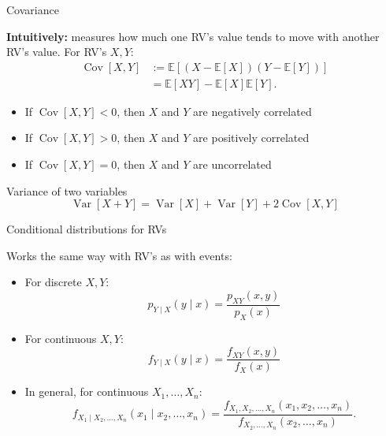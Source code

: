 \documentclass[aspectratio=169,12pt]{beamer}
\DeclareMathOperator{\Var}{Var}
\DeclareMathOperator{\Cov}{Cov}
\begin{document}
\begin{frame}[t]{Covariance}
  \vspace{0.14cm}
  {\small
  \textbf{Intuitively:} measures how much one RV's value tends to move with
  another RV's value. For RV's $X,Y$:
  \[
  \begin{aligned}
    \Cov[X,Y]&:=\mathbb{E}[(X-\mathbb{E}[X])(Y-\mathbb{E}[Y])]\\
             &=\mathbb{E}[XY]-\mathbb{E}[X]\mathbb{E}[Y].
  \end{aligned}
  \]
  \begin{itemize}
    \setlength{\itemsep}{0.10cm}
    \item If $\Cov[X,Y]<0$, then $X$ and $Y$ are negatively correlated
    \item If $\Cov[X,Y]>0$, then $X$ and $Y$ are positively correlated
    \item If $\Cov[X,Y]=0$, then $X$ and $Y$ are uncorrelated
  \end{itemize}
  }
\end{frame}

\begin{frame}[t]{Variance of two variables}
  \vspace{1.55cm}
  {\fontsize{21}{26}\selectfont
  \[
    \Var[X+Y]=\Var[X]+\Var[Y]+2\Cov[X,Y]
  \]
  }
\end{frame}

\begin{frame}[t]{Conditional distributions for RVs}
  \vspace{-0.10cm}
  {
  Works the same way with RV's as with events:
  \begin{itemize}
    \setlength{\itemsep}{0.15cm}
    \item For discrete $X,Y$:
      \[
        p_{Y\mid X}(y\mid x)=\frac{p_{XY}(x,y)}{p_X(x)}
      \]
    \item For continuous $X,Y$:
      \[
        f_{Y\mid X}(y\mid x)=\frac{f_{XY}(x,y)}{f_X(x)}
      \]
    \item In general, for continuous $X_1,\ldots,X_n$:
      \[
        f_{X_1\mid X_2,\ldots,X_n}(x_1\mid x_2,\ldots,x_n)
        =\frac{f_{X_1,X_2,\ldots,X_n}(x_1,x_2,\ldots,x_n)}
        {f_{X_2,\ldots,X_n}(x_2,\ldots,x_n)}.
      \]
  \end{itemize}
  }
\end{frame}
\end{document}
